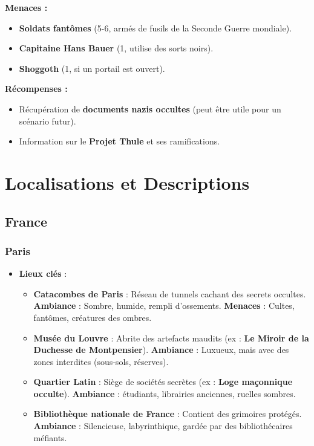 \documentclass[10pt,a5paper,twoside]{book}
\begin{document}
\begin{shaded}
\textbf{Menaces :}
	\begin{itemize}
		\item \textbf{Soldats fantômes} (5-6, armés de fusils de la Seconde Guerre mondiale).
		\item \textbf{Capitaine Hans Bauer} (1, utilise des sorts noirs).
		\item \textbf{Shoggoth} (1, si un portail est ouvert).
	\end{itemize}

\textbf{Récompenses :}
	\begin{itemize}
		\item Récupération de \textbf{documents nazis occultes} (peut être utile pour un scénario futur).
		\item Information sur le \textbf{Projet Thule} et ses ramifications.
	\end{itemize}
\end{shaded}

\newpage

\chapter{Localisations et Descriptions}

\section{France}

\subsection{Paris}
\begin{itemize}
	\item \textbf{Lieux clés} :
	\begin{itemize}
		\item \textbf{Catacombes de Paris} : Réseau de tunnels cachant des secrets occultes. \textbf{Ambiance} : Sombre, humide, rempli d'ossements. \textbf{Menaces} : Cultes, fantômes, créatures des ombres.
		\item \textbf{Musée du Louvre} : Abrite des artefacts maudits (ex : \textbf{Le Miroir de la Duchesse de Montpensier}). \textbf{Ambiance} : Luxueux, mais avec des zones interdites (sous-sols, réserves).
		\item \textbf{Quartier Latin} : Siège de sociétés secrètes (ex : \textbf{Loge maçonnique occulte}). \textbf{Ambiance} : étudiants, librairies anciennes, ruelles sombres.
		\item \textbf{Bibliothèque nationale de France} : Contient des grimoires protégés. \textbf{Ambiance} : Silencieuse, labyrinthique, gardée par des bibliothécaires méfiants.
	\end{itemize}
\end{itemize}
\end{document}
